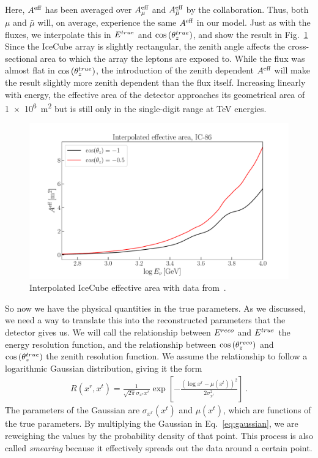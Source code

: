 Here, $A^\text{eff}$ has been averaged over $A^\text{eff}_\mu$ and $A^\text{eff}_{\bar{\mu}}$ by the collaboration. Thus, both $\mu$ and $\bar\mu$ will, on average, experience the same $A^\text{eff}$ in our model. 
Just as with the fluxes, we interpolate this in $E^{true}$ and $\cos{(\theta_z^{true})}$, and show the result in Fig.~\ref{fig:aeff}
Since the IceCube array is slightly rectangular, the zenith angle affects the cross-sectional area to which the array the leptons are exposed to.
While the flux was almost flat in $\cos{(\theta_z^{true})}$, the introduction of the zenith dependent $A^\text{eff}$ will make the result slightly more zenith dependent than the flux itself. 
Increasing linearly with energy, the effective area of the detector approaches its geometrical area of \SI{1e6}{\metre^2} but is still only in the single-digit range at \si{\TeV} energies.

\begin{figure}[ht]%
    \centering
    \includegraphics[scale=0.6]{figures/aeff.pdf}
    \caption{Interpolated IceCube effective area with data from~\cite{ICaeff}.}
    \label{fig:aeff}
\end{figure}

So now we have the physical quantities in the true parameters. 
As we discussed, we need a way to translate this into the reconstructed parameters that the detector gives us. We will call the relationship between 
$E^{reco}$ and $E^{true}$ the energy resolution function, and the relationship between $\cos{(\theta_z^{reco})}$ and $\cos{(\theta_z^{true})}$ the zenith resolution function. 
We assume the relationship to follow a logarithmic Gaussian distribution, giving it the form 
\begin{align}\label{eq:gaussian}
    R(x^r, x^t) = \frac{1}{\sqrt{2\pi} \sigma_{x^r}x^r} \exp\left[-\frac{(\log x^r-\mu(x^t))^2}{2\sigma_{x^r}^2}\right]\,.
\end{align}
The parameters of the Gaussian are $\sigma_{x^r}(x^t)$ and $\mu(x^t)$, which are functions of the true parameters. By multiplying the Gaussian in Eq.~\ref{eq:gaussian}, we are reweighing the values by the 
probability density of that point. This process is also called \emph{smearing} because it effectively spreads out the data around a certain point. 


